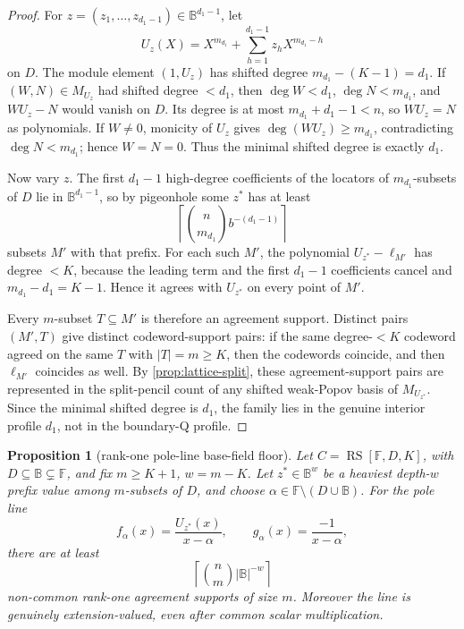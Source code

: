 \documentclass[a4paper,11pt]{amsart}
\newtheorem{proposition}[proposition]{Proposition}
\theoremstyle{remark}
\newcommand{\F}{\mathbb F}
\newcommand{\B}{\mathbb B}
\newcommand{\RS}{\operatorname{RS}}
\begin{document}
\begin{proof}
For \(z=(z_1,\ldots,z_{d_1-1})\in\B^{d_1-1}\), let
\[
        U_z(X)=X^{m_{d_1}}+\sum_{h=1}^{d_1-1}z_hX^{m_{d_1}-h}
\]
on \(D\).  The module element \((1,U_z)\) has shifted degree \(m_{d_1}-(K-1)=d_1\).  If \((W,N)\in M_{U_z}\) had shifted degree \(<d_1\), then \(\deg W<d_1\), \(\deg N<m_{d_1}\), and \(WU_z-N\) would vanish on \(D\).  Its degree is at most \(m_{d_1}+d_1-1<n\), so \(WU_z=N\) as polynomials.  If \(W\ne0\), monicity of \(U_z\) gives \(\deg(WU_z)\ge m_{d_1}\), contradicting \(\deg N<m_{d_1}\); hence \(W=N=0\).  Thus the minimal shifted degree is exactly \(d_1\).

Now vary \(z\).  The first \(d_1-1\) high-degree coefficients of the locators of \(m_{d_1}\)-subsets of \(D\) lie in \(\B^{d_1-1}\), so by pigeonhole some \(z^*\) has at least
\[
        \left\lceil\binom n{m_{d_1}}b^{-(d_1-1)}\right\rceil
\]
subsets \(M'\) with that prefix.  For each such \(M'\), the polynomial \(U_{z^*}-\ell_{M'}\) has degree \(<K\), because the leading term and the first \(d_1-1\) coefficients cancel and \(m_{d_1}-d_1=K-1\).  Hence it agrees with \(U_{z^*}\) on every point of \(M'\).

Every \(m\)-subset \(T\subseteq M'\) is therefore an agreement support.  Distinct pairs \((M',T)\) give distinct codeword-support pairs: if the same degree-\(<K\) codeword agreed on the same \(T\) with \(|T|=m\ge K\), then the codewords coincide, and then \(\ell_{M'}\) coincides as well.  By \cref{prop:lattice-split}, these agreement-support pairs are represented in the split-pencil count of any shifted weak-Popov basis of \(M_{U_{z^*}}\).  Since the minimal shifted degree is \(d_1\), the family lies in the genuine interior profile \(d_1\), not in the boundary-Q profile.
\end{proof}

\begin{proposition}[rank-one pole-line base-field floor]\label{prop:rank-one-floor}
Let \(C=\RS[\F,D,K]\), with \(D\subseteq\B\subsetneq\F\), and fix \(m\ge K+1\), \(w=m-K\).  Let \(z^*\in\B^w\) be a heaviest depth-\(w\) prefix value among \(m\)-subsets of \(D\), and choose \(\alpha\in\F\setminus(D\cup\B)\).  For the pole line
\[
        f_\alpha(x)=\frac{U_{z^*}(x)}{x-\alpha},\qquad
        g_\alpha(x)=\frac{-1}{x-\alpha},
\]
there are at least
\[
        \left\lceil\binom{n}{m}|\B|^{-w}\right\rceil
\]
non-common rank-one agreement supports of size \(m\).  Moreover the line is genuinely extension-valued, even after common scalar multiplication.
\end{proposition}
\end{document}
